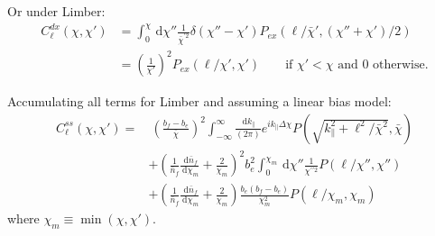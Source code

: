 \documentclass[onecolumn,prd,nofootinbib]{revtex4-1}
\newcommand{\ud}{\,\mathrm{d}}
\begin{document}
Or under Limber:
\begin{align}
C^{dx}_\ell(\chi,\chi')
    &=
    \int_0^\chi\ud\chi''
    \frac{1}{\bar\chi^{\prime 2}}
    \delta(\chi'' - \chi')
    P_{ex}(\ell/{\bar\chi'}, (\chi'' + \chi')/2)
    \\
    &=
    \left(\frac{1}{\chi'}\right)^2
    P_{ex}(\ell/\chi', \chi')
    \qquad \textrm{if $\chi' < \chi$ and 0 otherwise.}
\end{align}

Accumulating all terms for Limber and assuming a linear bias model:
\begin{align}
C^{ss}_\ell(\chi, \chi') =&~
    \left(\frac{b_f - b_e }{\bar\chi}\right)^2
        \int_{-\infty}^\infty\frac{\ud k_\parallel}{(2 \pi)} 
        e^{i k_\parallel \Delta\chi}
        P(\sqrt{k_\parallel^2 + \ell^2/\bar\chi^2}, \bar\chi)
    \\ &+
    \left(\frac{1}{\bar{n}_f}\frac{\ud \bar{n}_f}{\ud \chi_m}
    + \frac{2}{\chi_m} \right)^2
    b_e^2 \int_0^{\chi_m}\ud\chi''
    \frac{1}{\chi^{\prime\prime 2}}
        P(\ell/\chi'',\chi'')
    \\ &+
    \left(\frac{1}{\bar{n}_f}\frac{\ud \bar{n}_f}{\ud \chi_m}
    + \frac{2}{\chi_m} \right)
    \frac{b_e(b_f - b_e)}{\chi_m^2}
        P(\ell/\chi_m, \chi_m)
\end{align}
where $\chi_m \equiv \min(\chi, \chi')$.
\end{document}
